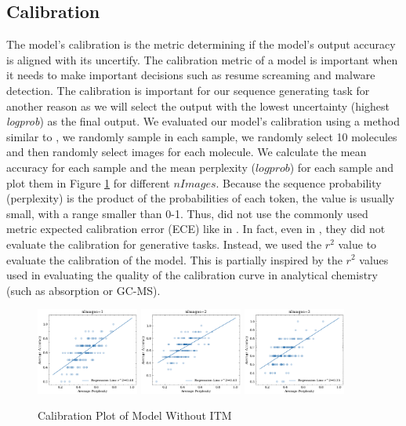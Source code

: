 \documentclass[12pt]{article}
\begin{document}
\subsection{Calibration}
The model's calibration is the metric determining if the model's output accuracy is aligned with its uncertify.  The calibration metric of a model is important when it needs to make important decisions such as resume screaming and malware detection. \autocite{liang_holistic_2023} The calibration is important for our sequence generating task for another reason as we will select the output with the lowest uncertainty (highest \textit{logprob}) as the final output. We evaluated our model's calibration using a method similar to \cite{liang_holistic_2023}, we randomly sample in each sample, we randomly select 10 molecules and then randomly select images for each molecule. We calculate the mean accuracy for each sample and the mean perplexity ($logprob$) for each sample and plot them in Figure \ref{fig:cal1} for different $nImages$. Because the sequence probability (perplexity) is the product of the probabilities of each token, the value is usually small, with a range smaller than 0-1. Thus, did not use the commonly used metric expected calibration error (ECE) like in \cite{liang_holistic_2023}. In fact, even in \autocite{liang_holistic_2023}, they did not evaluate the calibration for generative tasks. Instead, we used the $r^2$ value to evaluate the calibration of the model. This is partially inspired by the $r^2$ values used in evaluating the quality of the calibration curve in analytical chemistry (such as absorption or GC-MS). 
\begin{figure}
    \centering
    \includegraphics[width=0.3\textwidth]{caln1.png}
    \includegraphics[width=0.3\textwidth]{caln2.png}
    \includegraphics[width=0.3\textwidth]{caln3.png}
    \caption{Calibration Plot of Model Without ITM}
    \label{fig:cal1}
\end{figure}
\end{document}
